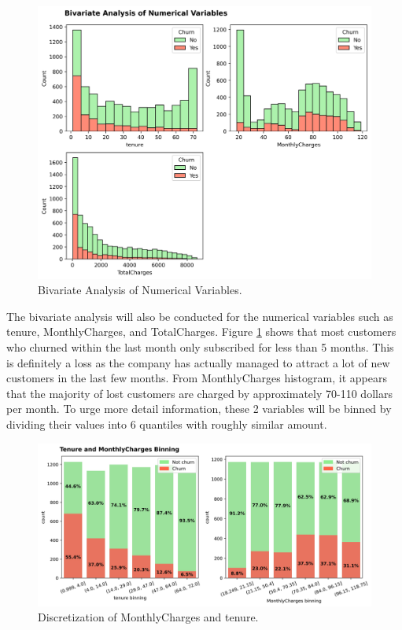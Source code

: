 \begin{figure}[!hb]
	\centering
	\includegraphics[width=1\linewidth]{figures/num_var_bi}
	\caption{Bivariate Analysis of Numerical Variables.}
	\label{fig:num_var_bi}
\end{figure}
The bivariate analysis will also be conducted for the numerical variables such as tenure, MonthlyCharges, and TotalCharges. Figure \ref{fig:num_var_bi} shows that most customers who churned within the last month only subscribed for less than 5 months. This is definitely a loss as the company has actually managed to attract a lot of new customers in the last few months. From MonthlyCharges histogram, it appears that the majority of lost customers are charged by approximately 70-110 dollars per month. To urge more detail information, these 2 variables will be binned by dividing their values into 6 quantiles with roughly similar amount. 
\begin{figure}[!htbp]
	\centering
	\includegraphics[width=1\linewidth]{figures/binning}
	\caption{Discretization of MonthlyCharges and tenure.}
	\label{fig:binning}
\end{figure}
